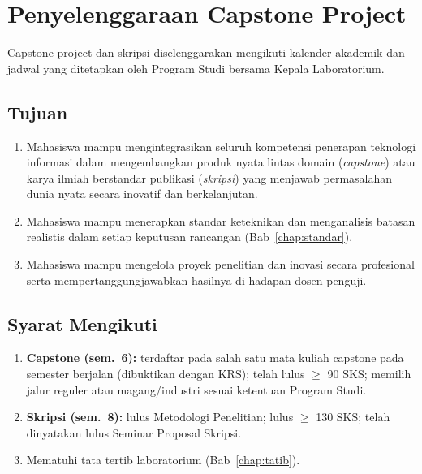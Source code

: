 \documentclass[12pt,a4paper]{report}
\begin{document}
\chapter{Penyelenggaraan Capstone Project}

Capstone project dan skripsi diselenggarakan mengikuti kalender akademik dan jadwal yang ditetapkan oleh Program Studi bersama Kepala Laboratorium.

\section{Tujuan}
\begin{enumerate}
\item Mahasiswa mampu mengintegrasikan seluruh kompetensi penerapan teknologi informasi dalam mengembangkan produk nyata lintas domain (\emph{capstone}) atau karya ilmiah berstandar publikasi (\emph{skripsi}) yang menjawab permasalahan dunia nyata secara inovatif dan berkelanjutan.
\item Mahasiswa mampu menerapkan standar keteknikan dan menganalisis batasan realistis dalam setiap keputusan rancangan (Bab~\ref{chap:standar}).
\item Mahasiswa mampu mengelola proyek penelitian dan inovasi secara profesional serta mempertanggungjawabkan hasilnya di hadapan dosen penguji.
\end{enumerate}

\section{Syarat Mengikuti}
\begin{enumerate}
\item \textbf{Capstone (sem.~6):} terdaftar pada salah satu mata kuliah capstone pada semester berjalan (dibuktikan dengan KRS); telah lulus $\geq$ 90 SKS; memilih jalur reguler atau magang/industri sesuai ketentuan Program Studi.
\item \textbf{Skripsi (sem.~8):} lulus Metodologi Penelitian; lulus $\geq$ 130 SKS; telah dinyatakan lulus Seminar Proposal Skripsi.
\item Mematuhi tata tertib laboratorium (Bab~\ref{chap:tatib}).
\end{enumerate}
\end{document}
